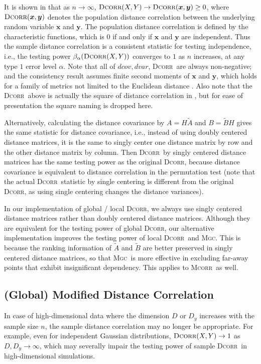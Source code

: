 \documentclass[11pt]{article}
\providecommand{\sct}[1]{{\normalfont\textsc{#1}}}
\providecommand{\mb}[1]{\boldsymbol{#1}}
\newcommand{\Mgc}{\sct{Mgc}}
\newcommand{\Dcorr}{\sct{Dcorr}}
\newcommand{\Mcorr}{\sct{Mcorr}}
\begin{document}
It is shown in \cite{SzekelyRizzoBakirov2007} that as $n \rightarrow \infty$, $\Dcorr(X,Y) \rightarrow \Dcorr(\mb{x},\mb{y}) \geq 0$, where $\Dcorr(\mb{x},\mb{y})$ denotes the population distance correlation between the underlying random variable $\mb{x}$ and $\mb{y}$. The population distance correlation is defined by the characteristic functions, which is $0$ if and only if $\mb{x}$ and $\mb{y}$ are independent. Thus the sample distance correlation is a consistent statistic for testing independence, i.e., the testing power $\beta_{\alpha}(\Dcorr(X,Y))$
converges to $1$ as $n$ increases, at any type $1$ error level $\alpha$. Note that all of $dcov, dvar$, \Dcorr~are always non-negative; and the consistency result assumes finite second moments of $\mb{x}$ and $\mb{y}$, which holds for a family of metrics not limited to the Euclidean distance \cite{Lyons2013}. Also note that the \Dcorr~above is actually the square of distance correlation in \cite{SzekelyRizzoBakirov2007}, but for ease of presentation the square naming is dropped here.

Alternatively, calculating the distance covariance by $A=H\tilde{A}$ and $B=\tilde{B}H$ gives the same statistic for distance covariance, i.e., instead of using doubly centered distance matrices, it is the same to singly center one distance matrix by row and the other distance matrix by column. Then \Dcorr~by singly centered distance matrices has the same testing power as the original \Dcorr, because distance covariance is equivalent to distance correlation in the permutation test (note that the actual \Dcorr~statistic by single centering is different from the original \Dcorr, as using single centering changes the distance variances).

In our implementation of global / local \Dcorr, we always use singly centered distance matrices rather than doubly centered distance matrices. Although they are equivalent for the testing power of global \Dcorr, our alternative implementation improves the testing power of local \Dcorr~and \Mgc. This is because the ranking information of $\tilde{A}$ and $\tilde{B}$ are better preserved in singly centered distance matrices, so that \Mgc~is more effective in excluding far-away points that exhibit insignificant dependency. This applies to \Mcorr~as well.

\subsection{(Global) Modified Distance Correlation}
\label{appen:mcorr}
In case of high-dimensional data where the dimension $D$ or $D_{y}$ increases with the sample size $n$, the sample distance correlation may no longer be appropriate. For example, even for independent Gaussian distributions, $\Dcorr(X,Y) \rightarrow 1$ as $D, D_{y} \rightarrow \infty$, which may severally impair the testing power of sample \Dcorr~in high-dimensional simulations.
\end{document}
